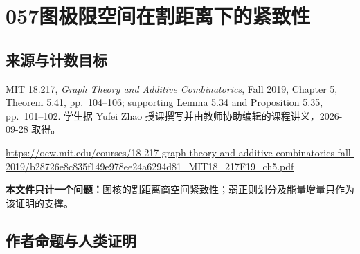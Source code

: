 \documentclass[UTF8,11pt]{ctexart}
\theoremstyle{definition}
\begin{document}
\section*{057\quad 图极限空间在割距离下的紧致性}
\subsection*{来源与计数目标}
MIT 18.217, \emph{Graph Theory and Additive Combinatorics}, Fall 2019, Chapter 5, Theorem 5.41, pp.~104--106; supporting Lemma 5.34 and Proposition 5.35, pp.~101--102. 学生据 Yufei Zhao 授课撰写并由教师协助编辑的课程讲义，2026-09-28 取得。
\par\url{https://ocw.mit.edu/courses/18-217-graph-theory-and-additive-combinatorics-fall-2019/b28726e8c835f149e978ee24a6294d81_MIT18_217F19_ch5.pdf}
\par\textbf{本文件只计一个问题：}图核的割距离商空间紧致性；弱正则划分及能量增量只作为该证明的支撑。
\subsection*{作者命题与人类证明}
\end{document}
